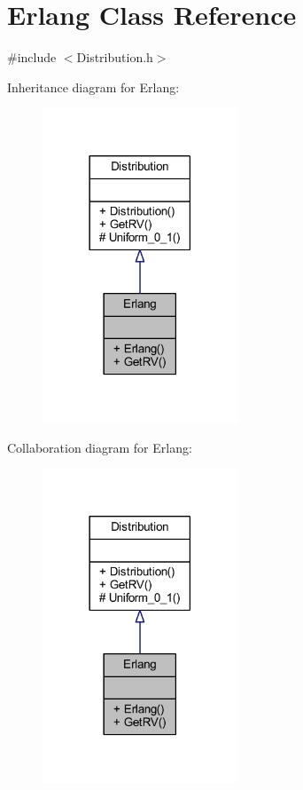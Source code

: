\hypertarget{class_erlang}{}\section{Erlang Class Reference}
\label{class_erlang}


{\ttfamily \#include $<$Distribution.\+h$>$}



Inheritance diagram for Erlang\+:
\nopagebreak
\begin{figure}[H]
\begin{center}
\leavevmode
\includegraphics[width=165pt]{class_erlang__inherit__graph}
\end{center}
\end{figure}


Collaboration diagram for Erlang\+:
\nopagebreak
\begin{figure}[H]
\begin{center}
\leavevmode
\includegraphics[width=165pt]{class_erlang__coll__graph}
\end{center}
\end{figure}
